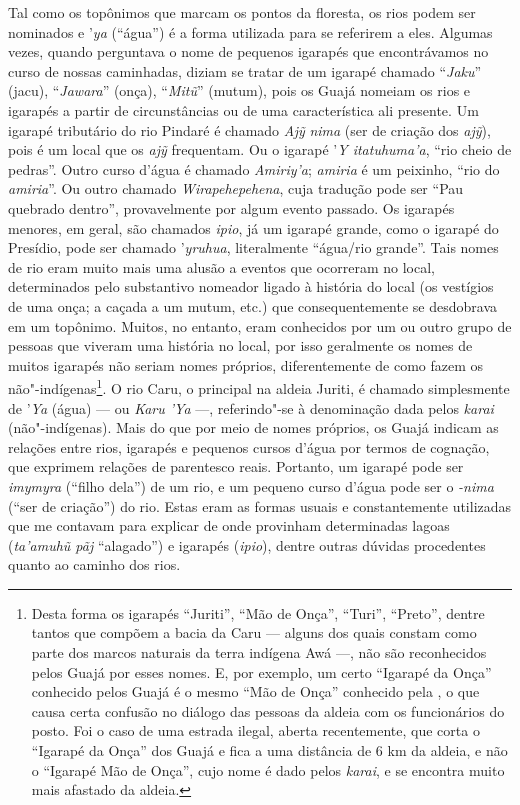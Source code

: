 Tal como os topônimos que marcam os pontos da floresta, os rios podem ser nominados 
e '\emph{ya} (``água'') é a forma utilizada para se
referirem a eles. Algumas vezes, quando perguntava o nome de pequenos
igarapés que encontrávamos no curso de nossas caminhadas, diziam se
tratar de um igarapé chamado ``\emph{Jaku}'' (jacu), ``\emph{Jawara}''
(onça), ``\emph{Mitũ}'' (mutum), pois os Guajá nomeiam os rios e igarapés
a partir de circunstâncias ou de uma característica ali presente. Um
igarapé tributário do rio Pindaré é chamado \emph{Ajỹ} \emph{nima} (ser
de criação dos \emph{ajỹ}), pois é um local que os \emph{ajỹ}
frequentam. Ou o igarapé '\emph{Y itatuhuma'a}, ``rio cheio de pedras''.
Outro curso d'água é chamado \emph{Amiriy'a}; \emph{amiria} é um
peixinho, ``rio do \emph{amiria}''. Ou outro chamado
\emph{Wirapehepehena}, cuja tradução pode ser  ``Pau quebrado dentro'',
provavelmente por algum evento passado. Os igarapés menores, em geral,
são chamados \emph{ipio}, já um igarapé grande, como o igarapé do
Presídio, pode ser chamado '\emph{yruhua}, literalmente ``água/rio
grande''. Tais nomes de rio eram muito mais uma alusão a eventos que
ocorreram no local, determinados pelo substantivo nomeador ligado à
história do local (os vestígios de uma onça; a caçada a um mutum, etc.)
que consequentemente se desdobrava em um topônimo. Muitos, no entanto,
eram conhecidos por um ou outro grupo de pessoas que viveram uma
história no local, por isso geralmente os nomes de muitos igarapés não
seriam nomes próprios, diferentemente de como fazem os
não"-indígenas\footnote{Desta forma os igarapés ``Juriti'', ``Mão de Onça'',
  ``Turi'', ``Preto'', dentre tantos que compõem a bacia da Caru --- alguns
  dos quais constam como parte dos marcos naturais da terra indígena
  Awá ---, não são reconhecidos pelos Guajá por esses nomes. E, por
  exemplo, um certo ``Igarapé da Onça'' conhecido pelos Guajá é o mesmo
  ``Mão de Onça'' conhecido pela , o que causa certa confusão no
  diálogo das pessoas da aldeia com os funcionários do posto. Foi o caso
  de uma estrada ilegal, aberta recentemente, que corta o ``Igarapé da
      Onça'' dos Guajá e fica a uma distância de 6 km da aldeia, e não o
  ``Igarapé Mão de Onça'', cujo nome é dado pelos \emph{karai}, e se
  encontra muito mais afastado da aldeia.}. O rio Caru, o principal na
aldeia Juriti, é chamado simplesmente de '\emph{Ya} (água) --- ou
\emph{Karu 'Ya} ---, referindo"-se à denominação dada pelos \emph{karai}
(não"-indígenas). Mais do que por meio de nomes próprios, os Guajá
indicam as relações entre rios, igarapés e pequenos cursos d'água por
termos de cognação, que exprimem relações de parentesco reais. Portanto,
um igarapé pode ser \emph{imymyra} (``filho dela'') de um rio, e um
pequeno curso d'água pode ser o \emph{-nima} (``ser de criação'') do rio.
Estas eram as formas usuais e constantemente utilizadas que me contavam
para explicar de onde provinham determinadas lagoas (\emph{ta'amuhũ pãj}
``alagado'') e igarapés (\emph{ipio}), dentre outras dúvidas procedentes
quanto ao caminho dos rios.


